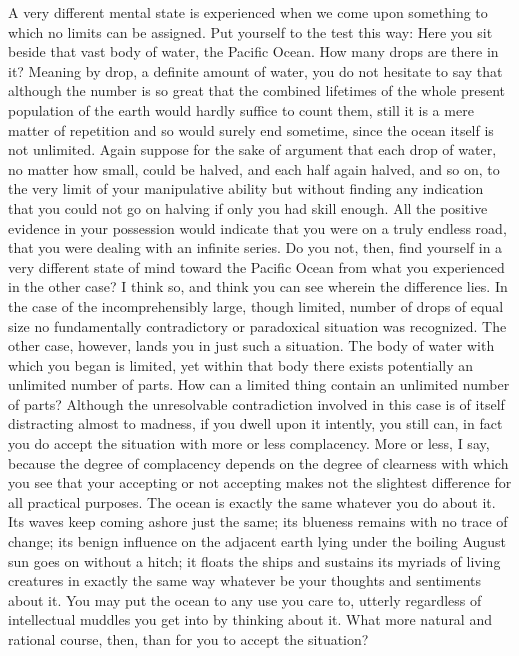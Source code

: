 \documentclass[a4paper, 11pt, oneside, polutonikogreek, english, landscape]{article}
\begin{document}
A very different mental state is experienced when we come upon something to which no limits can be assigned. Put yourself to the test this way: Here you sit beside that vast body of water, the Pacific Ocean. How many drops are there in it? Meaning by drop, a definite amount of water, you do not hesitate to say that although the number is so great that the combined lifetimes of the whole present population of the earth would hardly suffice to count them, still it is a mere matter of repetition and so would surely end sometime, since the ocean itself is not unlimited. Again suppose for the sake of argument that each drop of water, no matter how small, could be halved, and each half again halved, and so on, to the very limit of your manipulative ability but without finding any indication that you could not go on halving if only you had skill enough. All the positive evidence in your possession would indicate that you were on a truly endless road, that you were dealing with an infinite series. Do you not, then, find yourself in a very different state of mind toward the Pacific Ocean from what you experienced in the other case? I think so, and think you can see wherein the difference lies. In the case of the incomprehensibly large, though limited, number of drops of equal size no fundamentally contradictory or paradoxical situation was recognized. The other case, however, lands you in just such a situation. The body of water with which you began is limited, yet within that body there exists potentially an unlimited number of parts. How can a limited thing contain an unlimited number of parts? Although the unresolvable contradiction involved in this case is of itself distracting almost to madness, if you dwell upon it intently, you still can, in fact you do accept the situation with more or less complacency. More or less, I say, because the degree of complacency depends on the degree of clearness with which you see that your accepting or not accepting makes not the slightest difference for all practical purposes. The ocean is exactly the same whatever you do about it. Its waves keep coming ashore just the same; its blueness remains with no trace of change; its benign influence on the adjacent earth lying under the boiling August sun goes on without a hitch; it floats the ships and sustains its myriads of living creatures in exactly the same way whatever be your thoughts and sentiments about it. You may put the ocean to any use you care to, utterly regardless of intellectual muddles you get into by thinking about it. What more natural and rational course, then, than for you to accept the situation?
\end{document}
